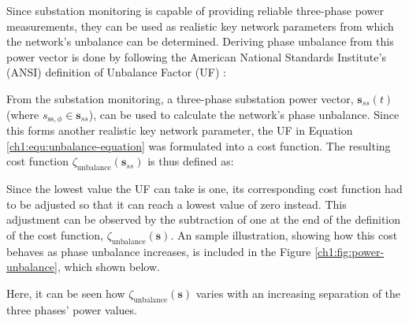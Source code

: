 
Since substation monitoring is capable of providing reliable three-phase power measurements, they can be used as realistic key network parameters from which the network's unbalance can be determined.
Deriving phase unbalance from this power vector is done by following the American National Standards Institute's (ANSI) definition of Unbalance Factor (UF) \cite{ANSI-MB-1-2011}:




From the substation monitoring, a three-phase substation power vector, $\textbf{s}_{ss}(t)$ (where $s_{\text{ss},\phi} \in \textbf{s}_{ss}$), can be used to calculate the network's phase unbalance.
Since this forms another realistic key network parameter, the UF in Equation \ref{ch1:equ:unbalance-equation} was formulated into a cost function.
The resulting cost function $\zeta_\text{unbalance}(\textbf{s}_{ss})$ is thus defined as:



Since the lowest value the UF can take is one, its corresponding cost function had to be adjusted so that it can reach a lowest value of zero instead.
This adjustment can be observed by the subtraction of one at the end of the definition of the cost function, $\zeta_\text{unbalance}(\textbf{s})$.
An sample illustration, showing how this cost behaves as phase unbalance increases, is included in the Figure \ref{ch1:fig:power-unbalance}, which shown below.



Here, it can be seen how $\zeta_\text{unbalance}(\textbf{s})$ varies with an increasing separation of the three phases' power values.

